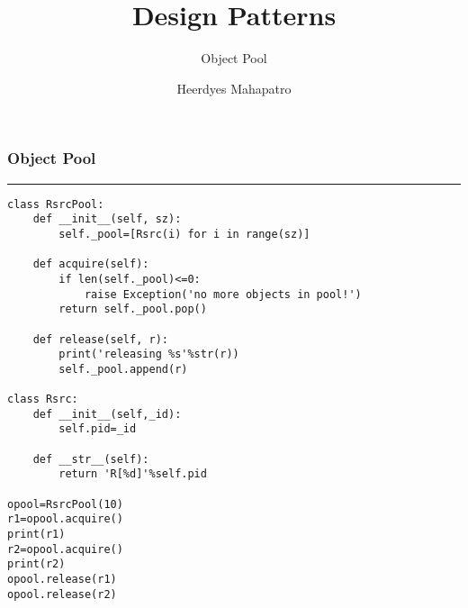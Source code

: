 \documentclass{beamer}
\title{Design Patterns}
\subtitle{Object Pool}
\author{Heerdyes Mahapatro}
\begin{document}
	\frame {
		\titlepage
	}
	\begin{frame}[fragile]
	    \frametitle{Object Pool}
	    \rule{\textwidth}{1pt}
	    \scriptsize
	    \begin{verbatim}
class RsrcPool:
    def __init__(self, sz):
        self._pool=[Rsrc(i) for i in range(sz)]

    def acquire(self):
        if len(self._pool)<=0:
            raise Exception('no more objects in pool!')
        return self._pool.pop()

    def release(self, r):
        print('releasing %s'%str(r))
        self._pool.append(r)

class Rsrc:
    def __init__(self,_id):
        self.pid=_id
        
    def __str__(self):
        return 'R[%d]'%self.pid

opool=RsrcPool(10)
r1=opool.acquire()
print(r1)
r2=opool.acquire()
print(r2)
opool.release(r1)
opool.release(r2)
	    \end{verbatim}
	\end{frame}
\end{document}
